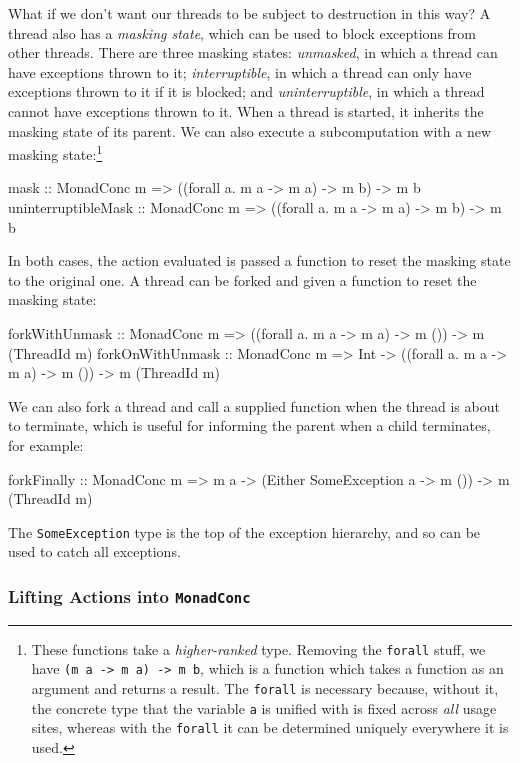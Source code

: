 What if we don't want our threads to be subject to destruction in this
way? A thread also has a \emph{masking state}, which can be used to
block exceptions from other threads. There are three masking states:
\emph{unmasked}, in which a thread can have exceptions thrown to it;
\emph{interruptible}, in which a thread can only have exceptions
thrown to it if it is blocked; and \emph{uninterruptible}, in which a
thread cannot have exceptions thrown to it. When a thread is started,
it inherits the masking state of its parent. We can also execute a
subcomputation with a new masking state:\footnote{These functions take
  a \emph{higher-ranked} type. Removing the \texttt{forall} stuff, we
  have \texttt{(m a -> m a) -> m b}, which is a function which takes a
  function as an argument and returns a result. The \texttt{forall} is
  necessary because, without it, the concrete type that the variable
  \texttt{a} is unified with is fixed across \emph{all} usage sites,
  whereas with the \texttt{forall} it can be determined uniquely
  everywhere it is used.}

\begin{haskellcode}
mask :: MonadConc m => ((forall a. m a -> m a) -> m b) -> m b
uninterruptibleMask :: MonadConc m => ((forall a. m a -> m a) -> m b) -> m b
\end{haskellcode}

In both cases, the action evaluated is passed a function to reset the
masking state to the original one. A thread can be forked and given a
function to reset the masking state:

\begin{haskellcode}
forkWithUnmask :: MonadConc m => ((forall a. m a -> m a) -> m ())
  -> m (ThreadId m)
forkOnWithUnmask :: MonadConc m => Int -> ((forall a. m a -> m a) -> m ())
  -> m (ThreadId m)
\end{haskellcode}

We can also fork a thread and call a supplied function when the thread
is about to terminate, which is useful for informing the parent when a
child terminates, for example:

\begin{haskellcode}
forkFinally :: MonadConc m => m a -> (Either SomeException a -> m ())
  -> m (ThreadId m)
\end{haskellcode}

The \verb|SomeException| type is the top of the exception hierarchy,
and so can be used to catch all exceptions.

\subsubsection{Lifting Actions into \texttt{MonadConc}}
\label{sec:abstraction-typeclass-lifting}

